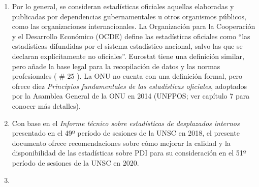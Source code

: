 \documentclass[
]{book}
\begin{document}
\begin{enumerate}
\item
  Por lo general, se consideran estadísticas oficiales aquellas elaboradas y publicadas por dependencias gubernamentales u otros organismos públicos, como las organizaciones internacionales. La Organización para la Cooperación y el Desarrollo Económico (OCDE) define las estadísticas oficiales como ``las estadísticas difundidas por el sistema estadístico nacional, salvo las que se declaran explícitamente no oficiales''. Eurostat tiene una definición similar, pero añade la base legal para la recopilación de datos y las normas profesionales (
  \# 25
  ). La ONU no cuenta con una definición formal, pero ofrece diez \emph{Principios fundamentales de las estadísticas oficiales}, adoptados por la Asamblea General de la ONU en 2014 (UNFPOS; ver capítulo 7 para conocer más detalles).
\item
  Con base en el \emph{Informe técnico sobre estadísticas de desplazados internos} presentado en el 49º período de sesiones de la UNSC en 2018, el presente documento ofrece recomendaciones sobre cómo mejorar la calidad y la disponibilidad de las estadísticas sobre PDI para su consideración en el 51º período de sesiones de la UNSC en 2020.
\item ~
  \hypertarget{vuxednculos-con-otros-productos-del-grupo-de-expertos-en-estaduxedsticas-sobre-personas-refugiadas-y-desplazadas-internas}{%
}
\end{enumerate}
\end{document}
